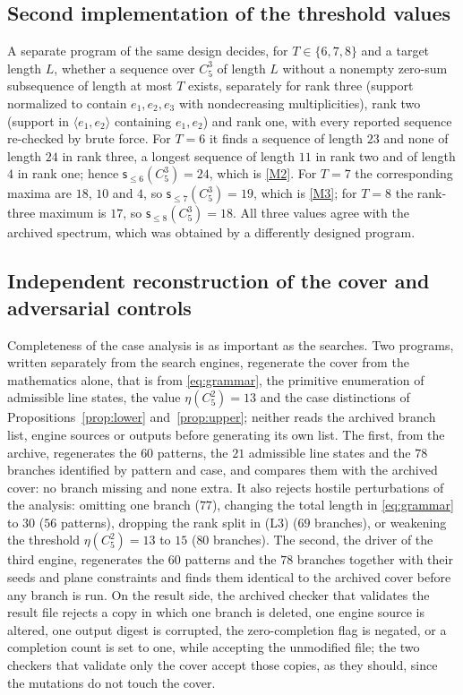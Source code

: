 \documentclass[11pt]{article}
\theoremstyle{definition}
\theoremstyle{remark}
\newcommand{\C}{C_5^{3}}
\newcommand{\sle}[1]{\mathsf{s}_{\le #1}}
\begin{document}
\subsection{Second implementation of the threshold values}\label{subsec:thresholds}

A separate program of the same design decides, for $T\in\{6,7,8\}$ and a target length $L$, whether a sequence over $\C$ of length $L$ without a nonempty zero-sum subsequence of length at most $T$ exists, separately for rank three (support normalized to contain $e_1,e_2,e_3$ with nondecreasing multiplicities), rank two (support in $\langle e_1,e_2\rangle$ containing $e_1,e_2$) and rank one, with every reported sequence re-checked by brute force. For $T=6$ it finds a sequence of length $23$ and none of length $24$ in rank three, a longest sequence of length $11$ in rank two and of length $4$ in rank one; hence $\sle{6}(\C)=24$, which is \ref{M2}. For $T=7$ the corresponding maxima are $18$, $10$ and $4$, so $\sle{7}(\C)=19$, which is \ref{M3}; for $T=8$ the rank-three maximum is $17$, so $\sle{8}(\C)=18$. All three values agree with the archived spectrum, which was obtained by a differently designed program.

\subsection{Independent reconstruction of the cover and adversarial controls}\label{subsec:verification}

Completeness of the case analysis is as important as the searches. Two programs, written separately from the search engines, regenerate the cover from the mathematics alone, that is from \eqref{eq:grammar}, the primitive enumeration of admissible line states, the value $\eta(C_5^2)=13$ and the case distinctions of Propositions~\ref{prop:lower} and~\ref{prop:upper}; neither reads the archived branch list, engine sources or outputs before generating its own list. The first, from the archive, regenerates the $60$ patterns, the $21$ admissible line states and the $78$ branches identified by pattern and case, and compares them with the archived cover: no branch missing and none extra. It also rejects hostile perturbations of the analysis: omitting one branch ($77$), changing the total length in \eqref{eq:grammar} to $30$ ($56$ patterns), dropping the rank split in (L3) ($69$ branches), or weakening the threshold $\eta(C_5^2)=13$ to $15$ ($80$ branches). The second, the driver of the third engine, regenerates the $60$ patterns and the $78$ branches together with their seeds and plane constraints and finds them identical to the archived cover before any branch is run. On the result side, the archived checker that validates the result file rejects a copy in which one branch is deleted, one engine source is altered, one output digest is corrupted, the zero-completion flag is negated, or a completion count is set to one, while accepting the unmodified file; the two checkers that validate only the cover accept those copies, as they should, since the mutations do not touch the cover.
\end{document}
